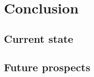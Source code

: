 \chapter{Conclusion}\label{chapter:conclusion}

\section{Current state}

\section{Future prospects}
